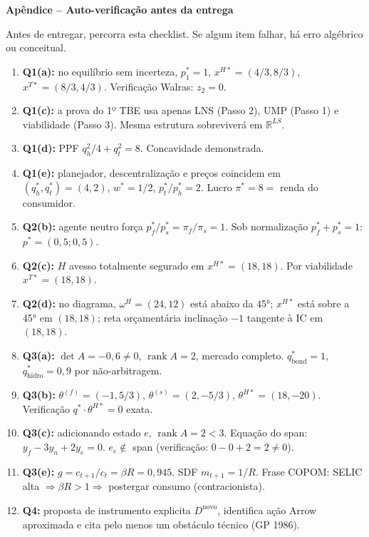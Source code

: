 \documentclass[11pt,addpoints]{exam}
\newcommand{\rank}{\operatorname{rank}}
\begin{document}
\newpage
\begin{center}\large\textbf{Apêndice -- Auto-verificação antes da entrega}\end{center}
\vspace{0.5em}

\noindent Antes de entregar, percorra esta checklist. Se algum item falhar, há erro algébrico ou conceitual.

\medskip
\begin{enumerate}[label=$\square$,leftmargin=*]
\item \textbf{Q1(a):} no equilíbrio sem incerteza, $p_1^* = 1$, $x^{H*} = (4/3, 8/3)$, $x^{T*} = (8/3, 4/3)$. Verificação Walras: $z_2 = 0$.
\item \textbf{Q1(c):} a prova do 1º TBE usa apenas LNS (Passo 2), UMP (Passo 1) e viabilidade (Passo 3). Mesma estrutura sobreviverá em $\mathbb{R}^{LS}$.
\item \textbf{Q1(d):} PPF $q_h^2/4 + q_t^2 = 8$. Concavidade demonstrada.
\item \textbf{Q1(e):} planejador, descentralização e preços coincidem em $(q_h^*, q_t^*) = (4, 2)$, $w^* = 1/2$, $p_t^*/p_h^* = 2$. Lucro $\pi^* = 8 = $ renda do consumidor.
\item \textbf{Q2(b):} agente neutro força $p^*_f/p^*_s = \pi_f/\pi_s = 1$. Sob normalização $p^*_f + p^*_s = 1$: $p^* = (0{,}5; 0{,}5)$.
\item \textbf{Q2(c):} $H$ avesso totalmente segurado em $x^{H*} = (18, 18)$. Por viabilidade $x^{T*} = (18, 18)$.
\item \textbf{Q2(d):} no diagrama, $\omega^H = (24, 12)$ está abaixo da 45°; $x^{H*}$ está sobre a 45° em $(18, 18)$; reta orçamentária inclinação $-1$ tangente à IC em $(18, 18)$.
\item \textbf{Q3(a):} $\det A = -0{,}6 \neq 0$, $\rank A = 2$, mercado completo. $q^*_{\text{bond}} = 1$, $q^*_{\text{hidro}} = 0{,}9$ por não-arbitragem.
\item \textbf{Q3(b):} $\theta^{(f)} = (-1, 5/3)$, $\theta^{(s)} = (2, -5/3)$, $\theta^{H*} = (18, -20)$. Verificação $q^* \cdot \theta^{H*} = 0$ exata.
\item \textbf{Q3(c):} adicionando estado $e$, $\rank A = 2 < 3$. Equação do span: $y_f - 3 y_n + 2 y_e = 0$. $e_e \notin $ span (verificação: $0 - 0 + 2 = 2 \neq 0$).
\item \textbf{Q3(e):} $g = c_{t+1}/c_t = \beta R = 0{,}945$. SDF $m_{t+1} = 1/R$. Frase COPOM: SELIC alta $\Rightarrow \beta R > 1 \Rightarrow$ postergar consumo (contracionista).
\item \textbf{Q4:} proposta de instrumento explicita $D^{\text{novo}}$, identifica ação Arrow aproximada e cita pelo menos um obstáculo técnico (GP 1986).
\end{enumerate}
\end{document}
